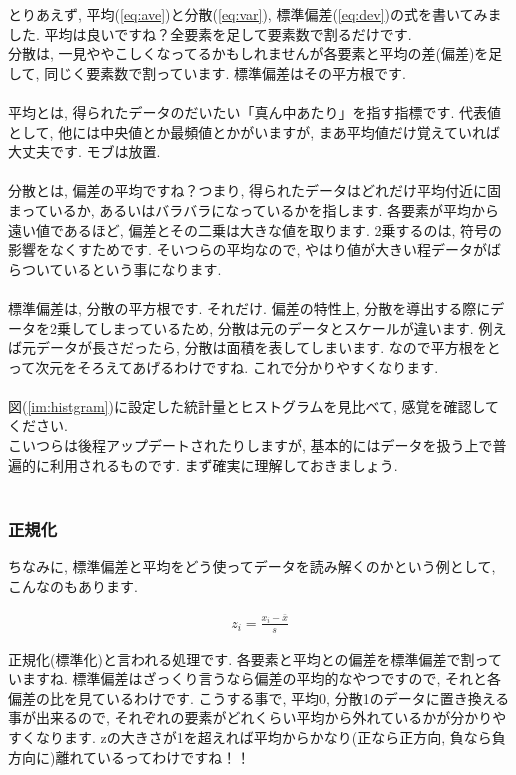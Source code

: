 \documentclass[11pt,a4paper]{jreport}
\begin{document}
とりあえず, 平均(\ref{eq:ave})と分散(\ref{eq:var}), 標準偏差(\ref{eq:dev})の式を書いてみました. 平均は良いですね？全要素を足して要素数で割るだけです.\\
分散は, 一見ややこしくなってるかもしれませんが各要素と平均の差(偏差)を足して, 同じく要素数で割っています. 標準偏差はその平方根です.\\
\\
平均とは, 得られたデータのだいたい「真ん中あたり」を指す指標です. 代表値として, 他には中央値とか最頻値とかがいますが, まあ平均値だけ覚えていれば大丈夫です. モブは放置.\\
\\
分散とは, 偏差の平均ですね？つまり, 得られたデータはどれだけ平均付近に固まっているか, あるいはバラバラになっているかを指します. 各要素が平均から遠い値であるほど, 偏差とその二乗は大きな値を取ります. 2乗するのは, 符号の影響をなくすためです. そいつらの平均なので, やはり値が大きい程データがばらついているという事になります.\\
\\
標準偏差は, 分散の平方根です. それだけ. 偏差の特性上, 分散を導出する際にデータを2乗してしまっているため, 分散は元のデータとスケールが違います. 例えば元データが長さだったら, 分散は面積を表してしまいます. なので平方根をとって次元をそろえてあげるわけですね. これで分かりやすくなります.\\
\\
図(\ref{im:histgram})に設定した統計量とヒストグラムを見比べて, 感覚を確認してください.
\\
こいつらは後程アップデートされたりしますが, 基本的にはデータを扱う上で普遍的に利用されるものです. まず確実に理解しておきましょう.\\
\\

\subsubsection{正規化}
ちなみに, 標準偏差と平均をどう使ってデータを読み解くのかという例として, こんなのもあります.

\begin{eqnarray}
z_i = \frac{x_i - \bar{x}}{s}
\end{eqnarray}

正規化(標準化)と言われる処理です. 各要素と平均との偏差を標準偏差で割っていますね. 標準偏差はざっくり言うなら偏差の平均的なやつですので, それと各偏差の比を見ているわけです. こうする事で, 平均0, 分散1のデータに置き換える事が出来るので, それぞれの要素がどれくらい平均から外れているかが分かりやすくなります. zの大きさが1を超えれば平均からかなり(正なら正方向, 負なら負方向に)離れているってわけですね！！\\
\end{document}
